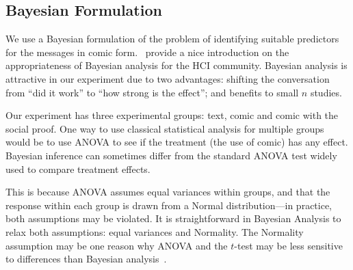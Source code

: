 \subsection{Bayesian Formulation}
\label{sub:Bayesian Formulation}
We use a Bayesian formulation of the problem of identifying suitable predictors for the messages in comic form.~\textcite{Kay2016} provide a nice introduction on the appropriateness of Bayesian analysis for the HCI community. Bayesian analysis is attractive in our experiment due to two advantages: shifting the conversation from ``did it work'' to ``how strong is the effect''; and benefits to small $n$ studies. 

Our experiment has three experimental groups: text, comic and comic with the social proof. One way to use classical statistical analysis for multiple groups would be to use ANOVA to see if the treatment (the use of comic) has any effect.  Bayesian inference can sometimes differ from the standard ANOVA test widely used to compare treatment effects.



This is because ANOVA assumes equal variances within groups, and that the response within each group is drawn from a Normal distribution---in practice, both assumptions may be violated.  It is straightforward in Bayesian Analysis to relax both assumptions: equal variances and Normality. The Normality assumption may be one reason why ANOVA and the $t$-test may be less sensitive to differences than Bayesian analysis~\parencite[][p. 470]{Kruschke2014}.

